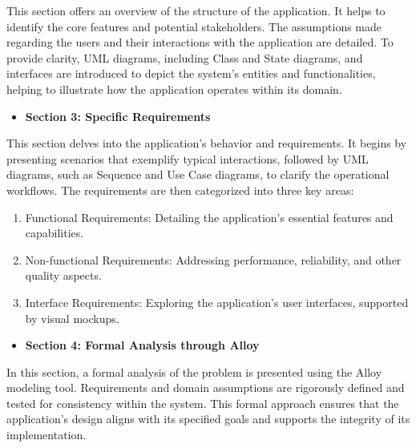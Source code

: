 This section offers an overview of the structure of the application. It helps to identify the core features and potential stakeholders. The assumptions made regarding the users and their interactions with the application are detailed. To provide clarity, UML diagrams, including Class and State diagrams, and interfaces are introduced to depict the system's entities and functionalities, helping to illustrate how the application operates within its domain.

\begin{itemize}
    \item\textbf{Section 3: Specific Requirements} 
\end{itemize}

This section delves into the application’s behavior and requirements. It begins by presenting scenarios that exemplify typical interactions, followed by UML diagrams, such as Sequence and Use Case diagrams, to clarify the operational workflows. The requirements are then categorized into three key areas:

\begin{enumerate}
    \item{Functional Requirements:}
    Detailing the application's essential features and capabilities.
    \item{Non-functional Requirements:} 
    Addressing performance, reliability, and other quality aspects.
    \item{Interface Requirements:} 
    Exploring the application’s user interfaces, supported by visual mockups.
\end{enumerate}


\begin{itemize}
    \item \textbf{Section 4: Formal Analysis through Alloy}
\end{itemize}

In this section, a formal analysis of the problem is presented using the Alloy modeling tool. Requirements and domain assumptions are rigorously defined and tested for consistency within the system. This formal approach ensures that the application’s design aligns with its specified goals and supports the integrity of its implementation.


